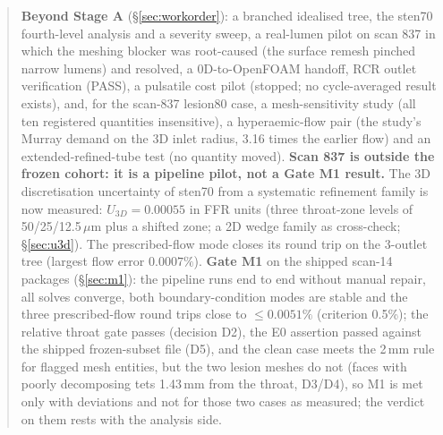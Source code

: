 \documentclass[11pt]{article}
\begin{document}
\begin{abstract}
\textbf{Beyond Stage A} (\S\ref{sec:workorder}): a branched idealised tree, the sten70 fourth-level analysis and a severity sweep, a real-lumen pilot on scan 837 in which the meshing blocker was root-caused (the surface remesh pinched narrow lumens) and resolved, a 0D-to-OpenFOAM handoff, RCR outlet verification (PASS), a pulsatile cost pilot (stopped; no cycle-averaged result exists), and, for the scan-837 lesion80 case, a mesh-sensitivity study (all ten registered quantities insensitive), a hyperaemic-flow pair (the study's Murray demand on the 3D inlet radius, 3.16 times the earlier flow) and an extended-refined-tube test (no quantity moved). \textbf{Scan 837 is outside the frozen cohort: it is a pipeline pilot, not a Gate M1 result.} The 3D discretisation uncertainty of sten70 from a systematic refinement family is now measured: $U_{3D}=0.00055$ in FFR units (three throat-zone levels of 50/25/12.5\,$\mu$m plus a shifted zone; a 2D wedge family as cross-check; \S\ref{sec:u3d}). The prescribed-flow mode closes its round trip on the 3-outlet tree (largest flow error $0.0007\%$). \textbf{Gate M1} on the shipped scan-14 packages (\S\ref{sec:m1}): the pipeline runs end to end without manual repair, all solves converge, both boundary-condition modes are stable and the three prescribed-flow round trips close to $\leq0.0051\%$ (criterion 0.5\%); the relative throat gate passes (decision D2), the E0 assertion passed against the shipped frozen-subset file (D5), and the clean case meets the 2\,mm rule for flagged mesh entities, but the two lesion meshes do not (faces with poorly decomposing tets 1.43\,mm from the throat, D3/D4), so M1 is met only with deviations and not for those two cases as measured; the verdict on them rests with the analysis side.
\end{abstract}

\tableofcontents
\listoffigures
\listoftables
\end{document}
